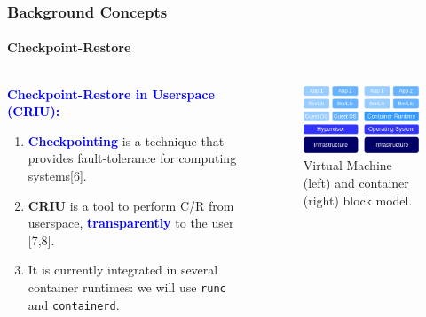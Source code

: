 \documentclass[9pt,    %
    english,            %
    xcolor=table,       %
    envcountsect,        %
    aspectratio=169     %
]{beamer}
\begin{document}
\begin{frame}
    \frametitle{Background Concepts}
    \framesubtitle{Checkpoint-Restore}

    \begin{columns}[t]
        \begin{column}{.55\textwidth}
            \textbf{\textcolor{blue}{Checkpoint-Restore in Userspace (CRIU):}}
            \begin{enumerate}
                \item \textbf{\textcolor{blue}{Checkpointing}} is a technique that provides fault-tolerance for computing systems[6].
                \item \textbf{CRIU} is a tool to perform C/R from userspace, \textbf{\textcolor{blue}{transparently}} to the user [7,8].
                \item It is currently integrated in several container runtimes: we will use \texttt{runc} and \texttt{containerd}.
            \end{enumerate}
        \end{column}
        \begin{column}{.35\textwidth}
            \begin{figure}[h!]
                \includegraphics[width=\textwidth]{./images/vm_vs_container.png}
                \caption{Virtual Machine (left) and container (right) block model.\label{fig:differences}}
            \end{figure}
        \end{column}
    \end{columns}
\end{frame}
\end{document}
